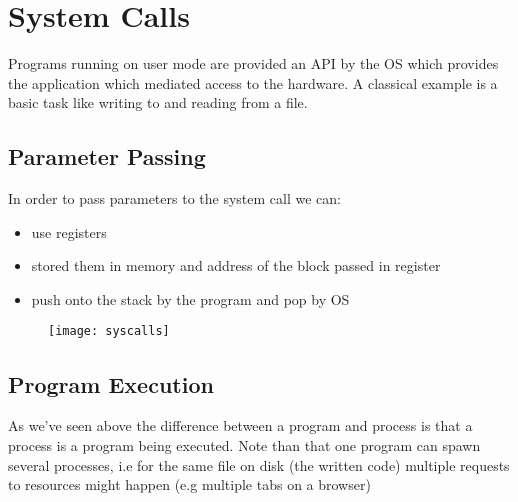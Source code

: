 \section{System Calls}




	\par{Programs running on user mode are provided an API by the OS which provides the application which mediated access to the hardware. A classical example is a basic task like writing to and reading from a file.}

	\subsection{Parameter Passing}

		\par{In order to pass parameters to the system call we can:}

		\begin{itemize}
			\item use registers
			\item stored them in memory and address of the block passed in register
			\item push onto the stack by the program and pop by OS
		\end{itemize}

	\begin{figure}[H]
		\begin{center}
		\texttt{[image: syscalls]}
		\end{center}
	\end{figure}

\subsection{Program Execution}

	\par{As we've seen above the difference between a program and process is that a process is a program being executed. Note than that one program can spawn several processes, i.e for the same file on disk (the written code) multiple requests to resources might happen (e.g multiple tabs on a browser)}

